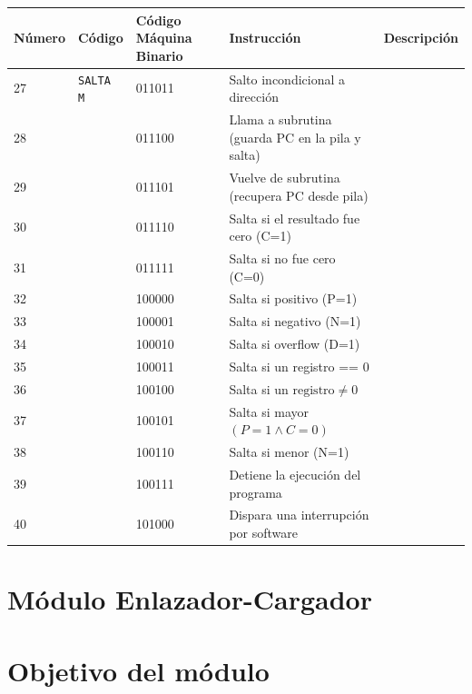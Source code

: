 \documentclass{article}
\begin{document}
\begin{table}[H]
    \centering
    \begin{tabular}{|p{1.3cm}|p{3cm}|p{1.6cm}|p{5cm}|p{4cm}|}
    \hline
    \textbf{Número} & \textbf{Código} & \textbf{Código Máquina Binario} & \textbf{Instrucción} & \textbf{Descripción} \\
    \hline
    27 & \texttt{SALTA M} & 011011 & Salto incondicional a dirección & \\
    \hline
    28 & & 011100 & Llama a subrutina (guarda PC en la pila y salta) & \\
    \hline
    29 & & 011101 & Vuelve de subrutina (recupera PC desde pila) & \\
    \hline
    30 & & 011110 & Salta si el resultado fue cero (C=1) & \\
    \hline
    31 & & 011111 & Salta si no fue cero (C=0) & \\
    \hline
    32 & & 100000 & Salta si positivo (P=1) & \\
    \hline
    33 & & 100001 & Salta si negativo (N=1) & \\
    \hline
    34 & & 100010 & Salta si overflow (D=1) & \\
    \hline
    35 & & 100011 & Salta si un registro == 0 & \\
    \hline
    36 & & 100100 & Salta si un $\text{registro} \neq 0$ & \\
    \hline
    37 & & 100101 & Salta si mayor $(P = 1 \land C = 0)$ & \\
    \hline
    38 & & 100110 & Salta si menor (N=1) & \\
    \hline
    39 & & 100111 & Detiene la ejecución del programa & \\
    \hline
    40 & & 101000 & Dispara una interrupción por software & \\
    \hline
    \end{tabular}
\end{table}



\section{Módulo Enlazador-Cargador}

\section*{Objetivo del módulo}
\end{document}
